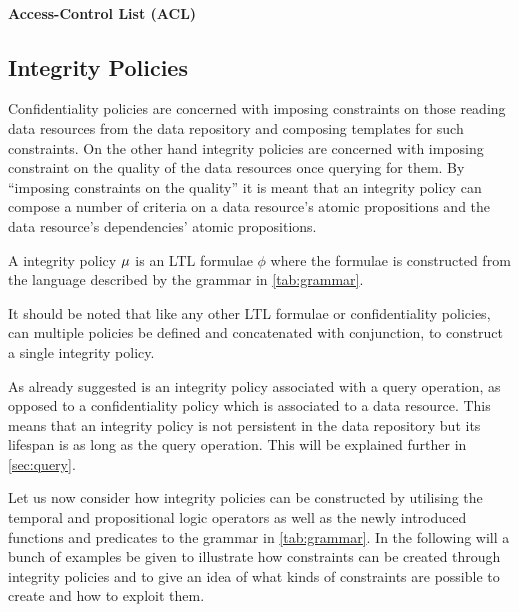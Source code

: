 \paragraph{Access-Control List (ACL)}

\subsection{Integrity Policies}
Confidentiality policies are concerned with imposing constraints on those reading data resources from the data repository and composing templates for such constraints. On the other hand integrity policies are concerned with imposing constraint on the quality of the data resources once querying for them. By ``imposing constraints on the quality'' it is meant that an integrity policy can compose a number of criteria on a data resource's atomic propositions and the data resource's dependencies' atomic propositions.
\begin{definition}\label{def:ip}
A integrity policy $\mu$ is an LTL formulae $\phi$ where the formulae is constructed from the language described by the grammar in \autoref{tab:grammar}.
\end{definition}
It should be noted that like any other LTL formulae or confidentiality policies, can multiple policies be defined and concatenated with conjunction, to construct a single integrity policy.

As already suggested is an integrity policy associated with a query operation, as opposed to a confidentiality policy which is associated to a data resource. This means that an integrity policy is not persistent in the data repository but its lifespan is as long as the query operation. This will be explained further in \autoref{sec:query}.

\begin{definition}\label{def:sip}
\end{definition}

Let us now consider how integrity policies can be constructed by utilising the temporal and propositional logic operators as well as the newly introduced functions and predicates to the grammar in \autoref{tab:grammar}. In the following will a bunch of examples be given to illustrate how constraints can be created through integrity policies and to give an idea of what kinds of constraints are possible to create and how to exploit them.

